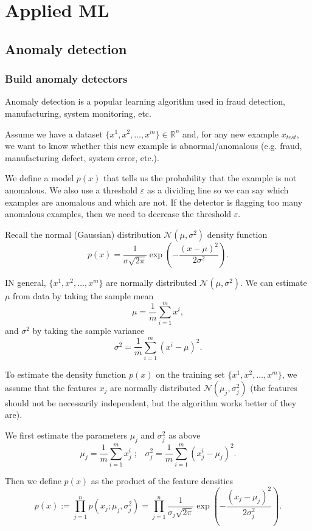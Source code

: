 \documentclass[a4paper,11pt]{report}
\newcommand{\ds}{\displaystyle}
\begin{document}
\chapter{Applied ML}

\section{Anomaly detection}

\subsection*{Build anomaly detectors}

Anomaly detection is a popular learning algorithm used in fraud detection, manufacturing, system monitoring, etc.

Assume we have a dataset $\{x^1, x^2,\ldots, x^m\}\in \mathbb{R}^n$ and, for any new example $x_{test}$, we want to know whether this new example is abnormal/anomalous (e.g. fraud, manufacturing defect, system error, etc.).

We define a model $p(x)$ that tells us the probability that the example is not anomalous. We also use a threshold $\varepsilon$ as a dividing line so we can say which examples are anomalous and which are not.
If the detector is flagging too many anomalous examples, then we need to decrease the threshold $\varepsilon$.

Recall the normal (Gaussian) distribution $\mathcal{N}(\mu, \sigma^2)$ density function
$$p(x) = \dfrac{1}{\sigma\sqrt{2\pi}} \exp\left(-\dfrac{(x-\mu)^2}{2\sigma^2}\right).$$

IN general, $\{x^1, x^2,\ldots, x^m\}$ are normally distributed $\mathcal{N}(\mu, \sigma^2)$. We can estimate $\mu$ from data by taking the sample mean
$$\mu = \dfrac{1}{m} \ds\sum_{i=1}^{m}{x^i},$$
and $\sigma^2$ by taking the sample variance
$$\sigma^2 = \dfrac{1}{m} \ds\sum_{i=1}^{m}{(x^i - \mu)}^2.$$

To estimate the density function $p(x)$ on the training set $\{x^1, x^2,\ldots, x^m\}$, we assume that the features $x_j$ are normally distributed $\mathcal{N}(\mu_j, \sigma_j^2)$ (the features should not be necessarily independent, but the algorithm works better of they are).

We first estimate the parameters $\mu_j$ and $\sigma_j^2$ as above
$$\mu_j = \dfrac{1}{m} \ds\sum_{i=1}^{m}{x_j^i}  \; ; \;\;\;  \sigma_j^2 = \dfrac{1}{m} \ds\sum_{i=1}^{m}{(x_j^i - \mu_j)}^2.$$

Then we define $p(x)$ as the product of the feature densities
$$ p(x) := \ds\prod_{j=1}^{n}{p(x_j; \mu_j, \sigma_j^2)} = \prod_{j=1}^{n}\dfrac{1}{\sigma_j\sqrt{2\pi}} \exp\left(-\dfrac{(x_j-\mu_j)^2}{2\sigma_j^2}\right).$$
\end{document}
